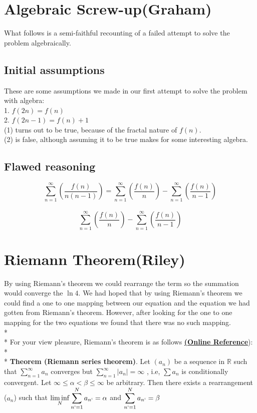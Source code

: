 \documentclass{article}
\begin{document}

\section{Algebraic Screw-up(Graham)}
What follows is a semi-faithful recounting of a failed attempt to solve the problem algebraically.
\subsection{Initial assumptions}
These are some assumptions we made in our first attempt to solve the problem with algebra:\\
1. $f(2n) = f(n)$\\
2. $f(2n-1) = f(n) + 1$\\

(1) turns out to be true, because of the fractal nature of $f(n)$.\\
(2) is false, although assuming it to be true makes for some interesting algebra.\\

\subsection{Flawed reasoning}
$$\sum_{n=1}^\infty \left( \frac{f(n)}{n(n-1)} \right)=\sum_{n=1}^\infty \left( \frac{f(n)}{n} \right)-\sum_{n=1}^\infty \left( \frac{f(n)}{n-1} \right)$$\\
$$\sum_{n=1}^\infty \left( \frac{f(n)}{n} \right)-\sum_{n=1}^\infty \left( \frac{f(n)}{n-1} \right)$$

\section{Riemann Theorem(Riley)}
By using Riemann's theorem we could rearrange the term so the summation would converge the $\ln 4$.  We had hoped that by using Riemann's theorem we could find a one to one mapping between our equation and the equation we had gotten from Riemann's theorem. However, after looking for the one to one mapping for the two equations we found that there was no such mapping.  
\\*
\\* For your view pleasure, Riemann's theorem is as follows \href{http://planetmath.org/encyclopedia/ConditionallyConvergentSeriesOfRealNumbersCanBeRearrangedToConvergeToAnyNumber.html}{{\bf (Online Reference}}):
\\*
\\*
{\bf Theorem (Riemann series theorem)}. Let $(a _{n})$ be a sequence in $\mathbb{R}$ such that $ \sum_{n=1}^{\infty} a _{n} $  converges but $ \sum_{n=1}^{\infty} |a _{n}| = \infty$ , i.e,  $ \sum a_{n} $ is conditionally convergent. Let $\infty \leq \alpha < \beta \leq \infty$  be arbitrary. Then there exists a rearrangement ($a _{n}$) such that $ \displaystyle\liminf_{N}   \sum_{n`=1}^{N} a _{n`} = \alpha$ and $\displaystyle\sum_{n`=1}^{N} a _{n`} = \beta$
\end{document}
